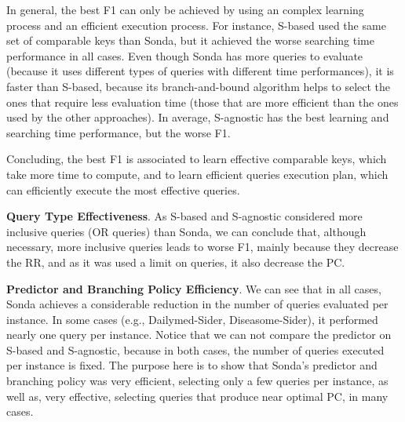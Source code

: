 In general, the best F1 can only be achieved by using an complex learning process and an efficient execution process. For instance, S-based used the same set of comparable keys than Sonda, but it achieved the worse searching time performance in all cases. Even though Sonda has more queries to evaluate (because it uses different types of queries with different time performances), it is faster than S-based, because its  branch-and-bound algorithm helps to select the ones that require less evaluation time (those that are more efficient than the ones used by the other approaches).  In average, S-agnostic has the best learning and searching time performance, but the worse F1. 

Concluding, the best F1 is associated to learn effective comparable keys, which take more time to compute, and to learn efficient queries execution plan, which can efficiently execute the most effective queries. 
 
\textbf{Query Type Effectiveness}. As S-based and S-agnostic considered more inclusive queries (OR queries) than Sonda, we can conclude that, although necessary, more inclusive queries leads to worse F1, mainly because they decrease the RR, and as it was used a limit on queries, it also decrease the PC. 

\textbf{Predictor and Branching Policy Efficiency}. We can see that in all cases, Sonda achieves a considerable reduction in the number of queries evaluated per instance. In some cases (e.g., Dailymed-Sider, Diseasome-Sider), it performed nearly one query per instance. Notice that we can not compare the predictor on S-based and S-agnostic, because in both cases, the number of queries executed per instance is fixed. The purpose here is to show  that Sonda's predictor and branching policy was very efficient, selecting only a few queries per instance, as well as, very effective, selecting queries that produce near optimal PC, in many cases. 


